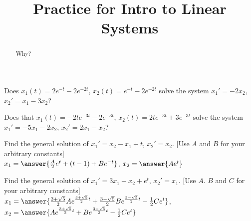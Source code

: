 \documentclass{ximera}
\title{Practice for Intro to Linear Systems}
\begin{document}
\begin{abstract}
Why?
\end{abstract}
\maketitle


\begin{exercise}
    Does $x_1(t) = 2e^{-t} - 2e^{-2t}$, $x_2(t) = e^{-t} - 2e^{-2t}$ solve the system $x_1' = - 2x_2 $, $x_2' = x_1 - 3x_2$?
    \begin{multipleChoice}
    \end{multipleChoice}
\end{exercise}

\begin{exercise}
    Does that $x_1(t) = -2te^{-3t} - 2e^{-3t}$, $x_2(t) = 2te^{-3t} + 3e^{-3t}$ solve the system $x_1' = -5x_1 - 2x_2 $, $x_2' = 2x_1 - x_2$?
    \begin{multipleChoice}
    \end{multipleChoice}
\end{exercise}

\begin{exercise}
    Find the general solution of $x_1' = x_2 - x_1 + t$, $x_2' = x_2$. [Use $A$ and $B$ for your arbitrary constants] \\
    $x_1 = \answer{\frac{A}{2}e^t + (t-1) + Be^{-t}}$, $x_2 = \answer{Ae^t}$
\end{exercise}

\begin{exercise}
    Find the general solution of $x_1' = 3 x_1 - x_2 + e^t$, $x_2' = x_1$. [Use $A$. $B$ and $C$ for your arbitrary constants] \\
    $x_1 = \answer{\frac{3+\sqrt{5}}{2}Ae^{\frac{3+\sqrt{5}}{2}t} + \frac{3-\sqrt{5}}{2}Be^{\frac{3-\sqrt{5}}{2}t} - \frac{1}{2}Ce^t}$, $x_2 = \answer{Ae^{\frac{3+\sqrt{5}}{2}t} + Be^{\frac{3-\sqrt{5}}{2}t} - \frac{1}{2}Ce^t}$
\end{exercise}
\end{document}
